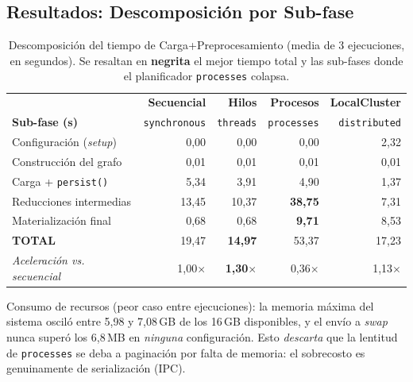 \documentclass[12pt,letterpaper]{article}
\begin{document}
\subsection{Resultados: Descomposición por Sub-fase}
\begin{table}[H]
\centering
\small
\begin{tabular}{lrrrr}
\toprule
 & \textbf{Secuencial} & \textbf{Hilos} & \textbf{Procesos} & \textbf{LocalCluster} \\
\textbf{Sub-fase (s)} & \texttt{synchronous} & \texttt{threads} & \texttt{processes} & \texttt{distributed} \\
\midrule
Configuración (\textit{setup})   & 0,00 & 0,00 & 0,00 & 2,32 \\
Construcción del grafo           & 0,01 & 0,01 & 0,01 & 0,01 \\
Carga + \texttt{persist()}       & 5,34 & 3,91 & 4,90 & 1,37 \\
Reducciones intermedias          & 13,45 & 10,37 & \textbf{38,75} & 7,31 \\
Materialización final            & 0,68 & 0,68 & \textbf{9,71} & 8,53 \\
\midrule
\textbf{TOTAL}                   & 19,47 & \textbf{14,97} & 53,37 & 17,23 \\
\textit{Aceleración vs. secuencial} & 1,00$\times$ & \textbf{1,30}$\boldsymbol{\times}$ & 0,36$\times$ & 1,13$\times$ \\
\bottomrule
\end{tabular}
\caption{Descomposición del tiempo de Carga+Preprocesamiento (media de 3 ejecuciones, en segundos).
Se resaltan en \textbf{negrita} el mejor tiempo total y las sub-fases donde el planificador
\texttt{processes} colapsa.}
\label{tab:benchmark}
\end{table}

\noindent Consumo de recursos (peor caso entre ejecuciones): la memoria máxima del sistema osciló
entre 5,98 y 7,08\,GB de los 16\,GB disponibles, y el envío a \textit{swap} nunca superó los
6,8\,MB en \textit{ninguna} configuración. Esto \textit{descarta} que la lentitud de
\texttt{processes} se deba a paginación por falta de memoria: el sobrecosto es genuinamente de
serialización (IPC).
\end{document}

